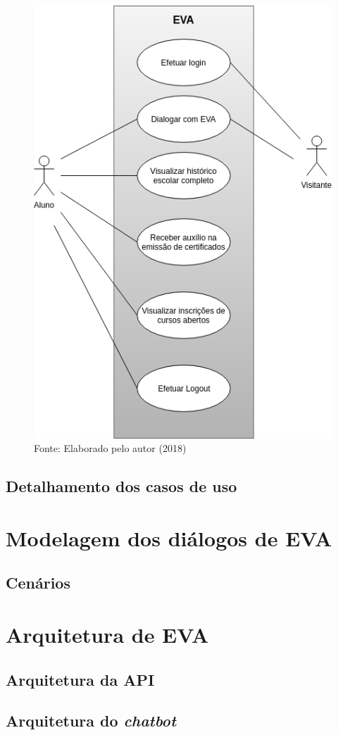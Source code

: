 \begin{figure}
\centering
\includegraphics[width=0.7\linewidth]{src/imagens/CasoDeUsoEva.png}
\caption{Fonte: Elaborado pelo autor (2018)}
\label{cap:01:fig:fluxograma}
\end{figure}

\subsection{Detalhamento dos casos de uso}

\section{Modelagem dos diálogos de EVA}

\subsection{Cenários}

\section{Arquitetura de EVA}

\subsection{Arquitetura da API}

\subsection{Arquitetura do \textit{chatbot}}